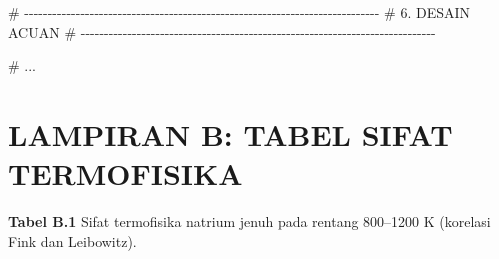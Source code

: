 \documentclass[
  indonesian,
  12pt,
  a4paper,
]{report}
\newenvironment{Shaded}{\begin{snugshade}}{\end{snugshade}}
\newcommand{\CommentTok}[1]{\textcolor[rgb]{0.37,0.37,0.37}{#1}}
\begin{document}
\begin{Shaded}
\begin{Highlighting}[]
\CommentTok{\# {-}{-}{-}{-}{-}{-}{-}{-}{-}{-}{-}{-}{-}{-}{-}{-}{-}{-}{-}{-}{-}{-}{-}{-}{-}{-}{-}{-}{-}{-}{-}{-}{-}{-}{-}{-}{-}{-}{-}{-}{-}{-}{-}{-}{-}{-}{-}{-}{-}{-}{-}{-}{-}{-}{-}{-}{-}{-}{-}{-}{-}{-}{-}{-}{-}{-}{-}{-}{-}{-}{-}{-}{-}{-}{-}{-}}
\CommentTok{\# 6. DESAIN ACUAN}
\CommentTok{\# {-}{-}{-}{-}{-}{-}{-}{-}{-}{-}{-}{-}{-}{-}{-}{-}{-}{-}{-}{-}{-}{-}{-}{-}{-}{-}{-}{-}{-}{-}{-}{-}{-}{-}{-}{-}{-}{-}{-}{-}{-}{-}{-}{-}{-}{-}{-}{-}{-}{-}{-}{-}{-}{-}{-}{-}{-}{-}{-}{-}{-}{-}{-}{-}{-}{-}{-}{-}{-}{-}{-}{-}{-}{-}{-}{-}}

\CommentTok{\# ...}

\end{Highlighting}
\end{Shaded}

\chapter*{LAMPIRAN B: TABEL SIFAT
TERMOFISIKA}\label{lampiran-b-tabel-sifat-termofisika}

\textbf{Tabel B.1} Sifat termofisika natrium jenuh pada rentang
800--1200 K (korelasi Fink dan Leibowitz).
\end{document}
